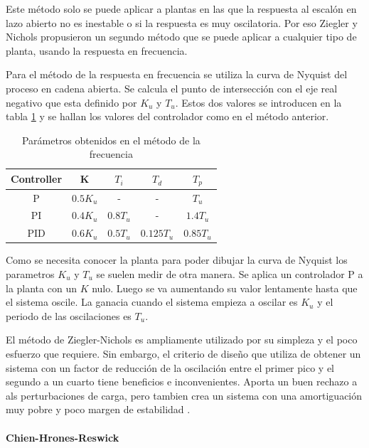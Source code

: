 \documentclass{book}
\begin{document}
Este m\'etodo solo se puede aplicar a plantas en las que la respuesta al escal\'on en lazo abierto no es inestable o si la respuesta es muy oscilatoria. Por eso Ziegler y Nichols propusieron un segundo m\'etodo que se puede aplicar a cualquier tipo de planta, usando la respuesta en frecuencia. \par

Para el m\'etodo de la respuesta en frecuencia se utiliza la curva de Nyquist del proceso en cadena abierta. Se calcula el punto de intersecci\'on con el eje real negativo que esta definido por $K_{u}$ y $T_{u}$. Estos dos valores se introducen en la tabla \ref{ta:ZNfreq} y se hallan los valores del controlador como en el m\'etodo anterior. \par

\begin{table}[h!]
\centering
\caption{Par\'ametros obtenidos en el m\'etodo de la frecuencia \cite{PIDbook}}
\label{ta:ZNfreq}
\begin{tabular}{c|cccc}
Controller & K        & $T_{i}$  & $T_{d}$    & $T_{p}$   \\ \hline
P          & $0.5K_u$ & -        & -          & $T_u$     \\
PI         & $0.4K_u$ & $0.8T_u$ & -          & $1.4T_u$  \\
PID        & $0.6K_u$ & $0.5T_u$ & $0.125T_u$ & $0.85T_u$
\end{tabular}
\end{table}

Como se necesita conocer la planta para poder dibujar la curva de Nyquist los parametros $K_u$ y $T_u$ se suelen medir de otra manera. Se aplica un controlador P a la planta con un $K$ nulo. Luego se va aumentando su valor lentamente hasta que el sistema oscile. La ganacia cuando el sistema empieza a oscilar es $K_u$ y el periodo de las oscilaciones es $T_u$. \par

El m\'etodo de Ziegler-Nichols es ampliamente utilizado por su simpleza y el poco esfuerzo que requiere. Sin embargo, el criterio de diseño que utiliza de obtener un sistema con un factor de reducci\'on de la oscilaci\'on entre el primer pico y el segundo a un cuarto tiene beneficios e inconvenientes. Aporta un buen rechazo a als perturbaciones de carga, pero tambien crea un sistema con una amortiguaci\'on muy pobre y poco margen de estabilidad \cite{PIDbook}. \par

		\paragraph{Chien-Hrones-Reswick}
\end{document}
